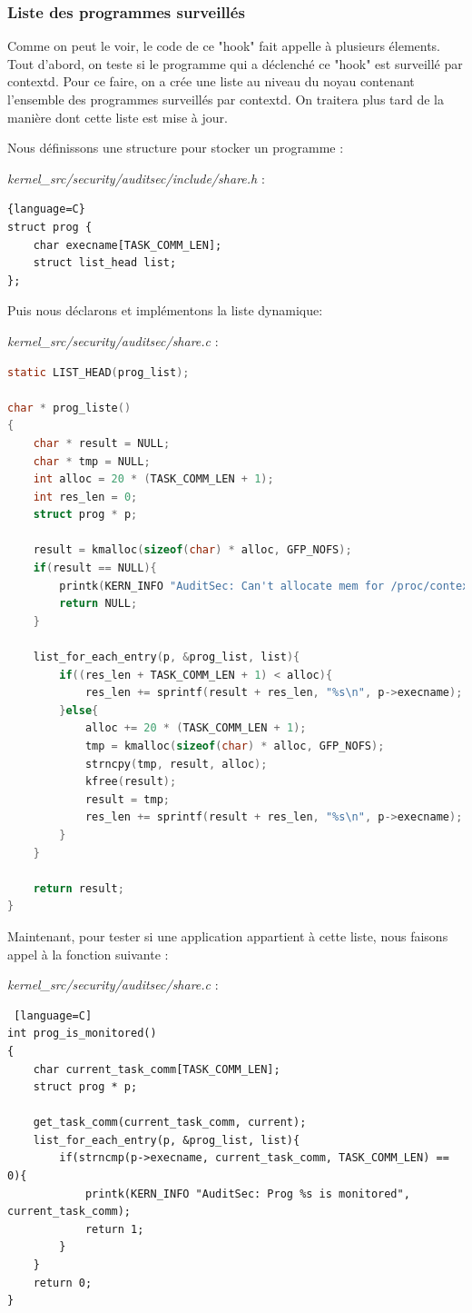 \documentclass[pdftex,a4paper,titlepage,11pt]{article}
\begin{document}
\subsubsection{Liste des programmes surveillés}

Comme on peut le voir, le code de ce "hook" fait appelle à plusieurs élements. Tout d'abord, on teste si le programme qui a déclenché ce "hook" est surveillé par contextd. Pour ce faire, on a crée une liste au niveau du noyau contenant l'ensemble des programmes surveillés par contextd. On traitera plus tard de la manière dont cette liste est mise à jour. 

Nous définissons une structure pour stocker un programme :

\textit{{kernel\_src}/security/auditsec/include/share.h} :
\begin{lstlisting}{language=C}
struct prog {
	char execname[TASK_COMM_LEN];
	struct list_head list;
};
\end{lstlisting}

Puis nous déclarons et implémentons la liste dynamique:

\textit{{kernel\_src}/security/auditsec/share.c} :
\begin{lstlisting}[language=C]
static LIST_HEAD(prog_list);

char * prog_liste()
{
	char * result = NULL;
	char * tmp = NULL;
	int alloc = 20 * (TASK_COMM_LEN + 1);
	int res_len = 0;
	struct prog * p;
	
	result = kmalloc(sizeof(char) * alloc, GFP_NOFS);
	if(result == NULL){
		printk(KERN_INFO "AuditSec: Can't allocate mem for /proc/contextd/programs");
		return NULL;
	}

	list_for_each_entry(p, &prog_list, list){
		if((res_len + TASK_COMM_LEN + 1) < alloc){
			res_len += sprintf(result + res_len, "%s\n", p->execname);
		}else{
			alloc += 20 * (TASK_COMM_LEN + 1);
			tmp = kmalloc(sizeof(char) * alloc, GFP_NOFS);
			strncpy(tmp, result, alloc);
			kfree(result);
			result = tmp;
			res_len += sprintf(result + res_len, "%s\n", p->execname);
		}
	}

	return result;
}
\end{lstlisting} 

Maintenant, pour tester si une application appartient à cette liste, nous faisons appel à la fonction suivante :

\textit{{kernel\_src}/security/auditsec/share.c} :
\begin{lstlisting} [language=C]
int prog_is_monitored()
{
	char current_task_comm[TASK_COMM_LEN];
	struct prog * p;

	get_task_comm(current_task_comm, current);
	list_for_each_entry(p, &prog_list, list){
		if(strncmp(p->execname, current_task_comm, TASK_COMM_LEN) == 0){
			printk(KERN_INFO "AuditSec: Prog %s is monitored", current_task_comm);
			return 1;
		}
	}
	return 0;
}
\end{lstlisting} 
\end{document}
